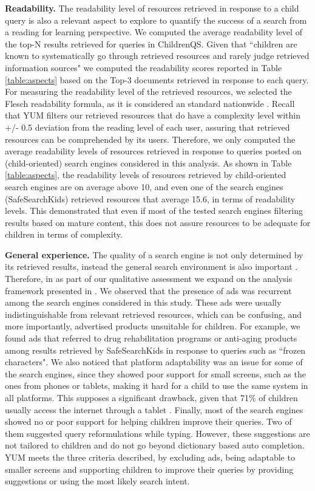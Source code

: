 \documentclass{sig-alternate-05-2015}
\begin{document}
\noindent
\textbf{Readability.} The readability level of resources retrieved in response to a child query is also a relevant aspect to explore to quantify the success of a search from a reading for learning perspective. We computed the average readability level of the top-N results retrieved for queries in ChildrenQS. Given that ``children are known to systematically go through retrieved resources and rarely judge retrieved information sources" \cite{Gra03} we computed the readability scores reported in Table \ref{table:aspects} based on the Top-3 documents retrieved in response to each query. For measuring the readability level of the retrieved resources, we selected the Flesch \cite{Fle48} readability formula, as it is considered an standard nationwide \cite{gru80}. Recall that YUM filters our retrieved resources that do have a complexity level within +/- 0.5 deviation from the reading level of each user, assuring that retrieved resources can be comprehended by its users.   Therefore, we only computed the average readability levels of resources retrieved in response to queries posted on (child-oriented) search engines considered in this analysis. As shown in Table \ref{table:aspects}, the readability levels of resources retrieved by child-oriented search engines are on average above 10, and even one of the search engines (SafeSearchKids) retrieved resources that average 15.6, in terms of readability levels. This demonstrated that even if most of the tested search engines filtering results based on mature content, this does not assure resources to be adequate for children in terms of complexity.

\noindent
\textbf{General experience.} The quality of a search engine is not only determined by its retrieved results, instead the general search environment is also important \cite{Gos13}. Therefore, in as part of our qualitative assessment we expand on the analysis framework presented in \cite{Gos13}. We observed that the presence of ads was recurrent among the search engines considered in this study. These ads were usually indistinguishable from relevant retrieved resources, which can be confusing, and more importantly, advertised products unsuitable for children. For example, we found ads that referred to drug rehabilitation programs or anti-aging products among results retrieved by SafeSearchKids in response to queries such as ``frozen characters". We also noticed that platform adaptability was an issue for some of the search engines, since they showed poor support for small screens, such as the ones from phones or tablets, making it hard for a child to use the same system in all platforms. This supposes a significant drawback, given that 71\% of children usually access the internet through a tablet \cite{ofcom}. Finally, most of the search engines showed no or poor support for helping children improve their queries. Two of them suggested query reformulations while typing. However, these suggestions are not tailored to children and do not go beyond dictionary based auto completion. YUM  meets the three criteria described, by excluding ads, being adaptable to smaller screens and supporting children to improve their queries by providing suggestions or using the most likely search intent.
\end{document}
